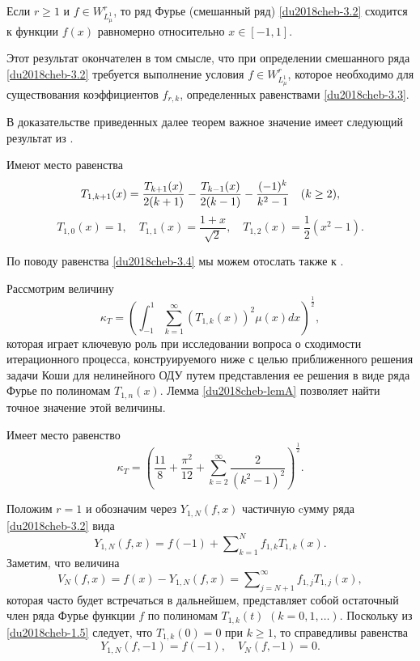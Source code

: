 \begin{theorem}\label{du2018cheb-thD}
	Если $r\ge1$ и  $f\in W^r_{L^1_\mu}$, то ряд Фурье (смешанный ряд) \eqref{du2018cheb-3.2} сходится к функции $f(x)$ равномерно относительно $x\in[-1,1]$.
\end{theorem}
Этот результат окончателен в том смысле, что при определении смешанного ряда \eqref{du2018cheb-3.2} требуется выполнение условия $f\in W^r_{L^1_\mu}$, которое необходимо для существования коэффициентов $f_{r,k}$, определенных равенствами \eqref{du2018cheb-3.3}.

В доказательстве приведенных далее теорем важное значение имеет следующий результат из \cite{SharIzv2018}.
\begin{lemma}\label{du2018cheb-lemA}
	Имеют место равенства
	\begin{equation}\label{du2018cheb-3.4}
	T_{1,k+1}(x)={T_{k+1}(x)\over2(k+1)}- {T_{k-1}(x)\over2(k-1)} -\frac{(-1)^k}{k^2-1}\quad (k\ge 2),
	\end{equation}
	\begin{equation}\label{du2018cheb-3.5}
	T_{1,0}(x)=1, \quad T_{1,1}(x)=\frac{1+x}{\sqrt{2}}, \quad T_{1,2}(x)=\frac12(x^2-1).
	\end{equation}
\end{lemma}
По поводу равенства \eqref{du2018cheb-3.4} мы можем отослать также к  \cite{Pash}.

Рассмотрим величину
\begin{equation}\label{du2018cheb-3.6}
\kappa_T=\left(\int_{-1}^1\sum_{k=1}^{\infty}(T_{1,k}(x))^2\mu(x)dx\right)^{\frac12},
\end{equation}
которая играет ключевую роль при исследовании вопроса о  сходимости итерационного процесса, конструируемого ниже с целью приближенного решения задачи Коши для    нелинейного ОДУ путем представления ее решения в виде ряда Фурье по полиномам $T_{1,n}(x)$. Лемма \ref{du2018cheb-lemA} позволяет найти точное значение этой величины.
\begin{theorem}\label{du2018cheb-th1}
	Имеет место равенство
	$$
	\kappa_ T=\left(\frac{11}{8}+\frac{\pi^2}{12}+\sum_{k=2}^\infty\frac{2}{(k^2-1)^2}\right)^\frac12.
	$$
\end{theorem}

Положим $r=1$ и обозначим через $Y_{1,N}(f,x)$ частичную cумму ряда \eqref{du2018cheb-3.2} вида
\begin{equation}\label{du2018cheb-3.12}
Y_{1,N}(f,x)= f(-1)+ \sum\nolimits_{k=1}^N  f_{1,k}T_{1,k}(x).
\end{equation}
Заметим,  что величина
\begin{equation}\label{du2018cheb-3.13}
V_N(f,x)=f(x)- Y_{1,N}(f,x)
=\sum\nolimits_{j=N+1}^\infty  f_{1,j}T_{1,j}(x),
\end{equation}
которая часто будет встречаться в дальнейшем,   представляет собой остаточный член ряда Фурье функции $f$ по полиномам $T_{1,k}(t)$ $(k=0,1,\ldots)$. Поскольку из \eqref{du2018cheb-1.5} следует, что $T_{1,k}(0)=0$ при $k\ge1$, то справедливы равенства
\begin{equation}\label{du2018cheb-3.14}
Y_{1,N}(f,-1)= f(-1),\quad V_N(f,-1)=0.
\end{equation}

